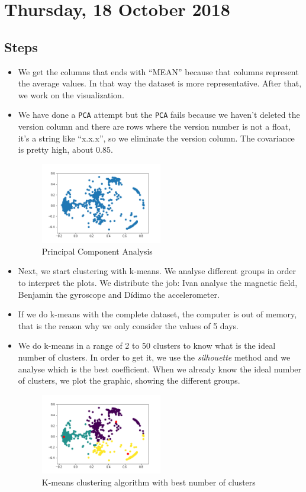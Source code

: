 \section{Thursday, 18 October 2018}

\subsection{Steps}
\begin{itemize}
\item We get the columns that ends with ``MEAN'' because that columns represent the average values. In that way the dataset is more representative. After that, we work on the visualization.
\item We have done a \texttt{PCA} attempt but the \texttt{PCA} fails because we haven't deleted the version column and there are rows where the version number is not a float, it's a string like ``x.x.x'', so we eliminate the version column.
The covariance is pretty high, about $0.85$.

\begin{figure}[!htb]
\centering
\includegraphics[width=0.5\textwidth]{../../reports/figures/PCA_AccelerometerStat.png}
\caption{Principal Component Analysis}
\label{fig:pca}
\end{figure}

\item Next, we start clustering with k-means. We analyse different groups in order to interpret the plots. We distribute the job: Ivan analyse the magnetic field, Benjamin the gyroscope and Dídimo the accelerometer.
\item If we do k-means with the complete dataset, the computer is out of memory, that is the reason why we only consider the values of 5 days.
\item We do k-means in a range of 2 to 50 clusters to know what is the ideal number of clusters. In order to get it, we use the \textit{silhouette} method and we analyse which is the best coefficient. When we already know the ideal number of clusters, we plot the graphic, showing the different groups. 

\begin{figure}[!htb]
\centering
\includegraphics[width=0.5\textwidth]{../../reports/figures/KMeans_AccelerometerStat.png}
\caption{K-means clustering algorithm with best number of clusters}
\label{fig:k-means}
\end{figure}
\end{itemize}
